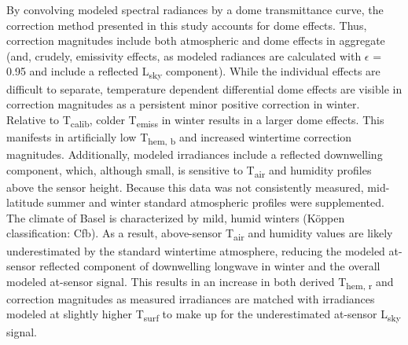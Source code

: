 By convolving modeled spectral radiances by a dome transmittance curve, the correction method presented in this study accounts for dome effects. Thus, correction magnitudes include both atmospheric and dome effects in aggregate (and, crudely, emissivity effects, as modeled radiances are calculated with $\epsilon$ = 0.95 and include a reflected L\textsubscript{sky} component). While the individual effects are difficult to separate, temperature dependent differential dome effects are visible in correction magnitudes as a persistent minor positive correction in winter. Relative to T\textsubscript{calib}, colder T\textsubscript{emiss} in winter results in a larger dome effects. This manifests in artificially low T\textsubscript{hem, b} and increased wintertime correction magnitudes. Additionally, modeled irradiances include a reflected downwelling component, which, although small, is sensitive to T\textsubscript{air} and humidity profiles above the sensor height. Because this data was not consistently measured, mid-latitude summer and winter standard atmospheric profiles were supplemented. The climate of Basel is characterized by mild, humid winters (K\"oppen classification: Cfb). As a result, above-sensor T\textsubscript{air} and humidity values are likely underestimated by the standard wintertime atmosphere, reducing the modeled at-sensor reflected component of downwelling longwave in winter and the overall modeled at-sensor signal. This results in an increase in both derived T\textsubscript{hem, r} and correction magnitudes as measured irradiances are matched with irradiances modeled at slightly higher T\textsubscript{surf} to make up for the underestimated at-sensor L\textsubscript{sky} signal. 

